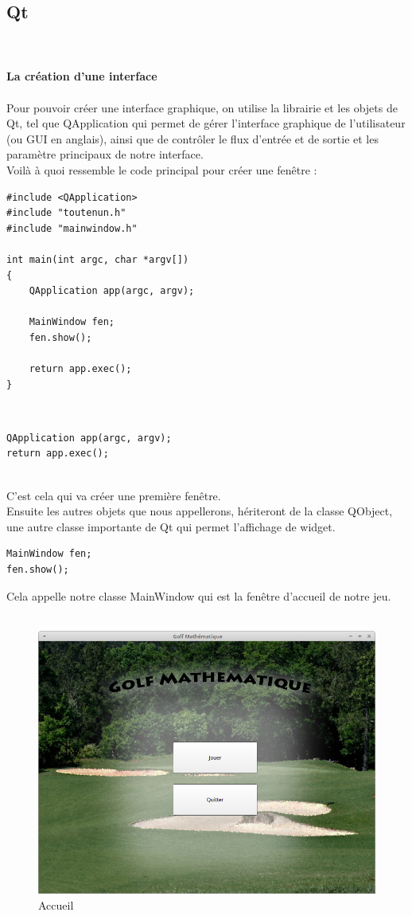 \documentclass{article}
\begin{document}
\subsection{Qt}
~\\~\\
\textbf{\large La création d'une interface}
\\~\\
Pour pouvoir créer une interface graphique, on utilise la librairie et les objets de Qt, tel que QApplication qui permet de gérer l'interface graphique de l'utilisateur (ou GUI en anglais), ainsi que de contrôler le flux d'entrée et de sortie et les paramètre principaux de notre interface.\\
Voilà à quoi ressemble le code principal pour créer une fenêtre :\\
\begin{verbatim}
#include <QApplication>
#include "toutenun.h"
#include "mainwindow.h"

int main(int argc, char *argv[])
{
    QApplication app(argc, argv);

    MainWindow fen;
    fen.show();

    return app.exec();
}
\end{verbatim}
~\\
\begin{verbatim}
QApplication app(argc, argv);
return app.exec();
\end{verbatim}
~\\
C'est cela qui va créer une première fenêtre.\\
Ensuite les autres objets que nous appellerons, hériteront de la classe QObject, une autre classe importante de Qt qui permet l'affichage de widget.\\
\begin{verbatim}
MainWindow fen;
fen.show();
\end{verbatim}
Cela appelle notre classe MainWindow qui est la fenêtre d'accueil de notre jeu.\\~\\
\begin{figure}[!h]
\centering 
\includegraphics[scale=0.3]{Images/accueil.png}
\caption{Accueil}
\end{figure}
\end{document}
